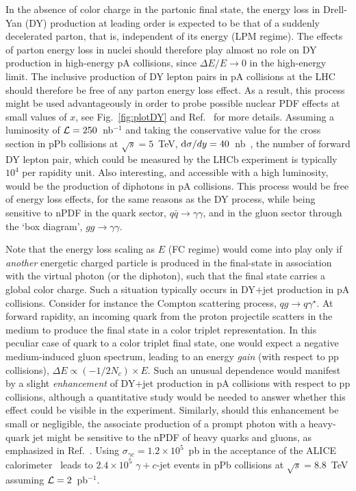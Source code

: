 \documentclass[../report.tex]{subfiles}
\begin{document}
In the absence of color charge in the partonic final state, the energy loss in Drell-Yan (DY) production at leading order is expected to be that of a suddenly decelerated parton, that is, independent of its energy (LPM regime). The effects of parton energy loss in nuclei should therefore play almost no role on DY production in high-energy pA collisions, since $\Delta E / E \to 0$ in the high-energy limit. The inclusive production of DY lepton pairs in pA collisions at the LHC should therefore be free of any parton energy loss effect. As a result, this process might be used advantageously in order to probe possible nuclear PDF effects at small values of $x$, see \eg Fig.~\ref{fig:plotDY} and Ref.~\cite{Arleo:2015qiv} for more details. Assuming a luminosity of ${\cal L}=250$~nb$^{-1}$ and taking the conservative value for the cross section in pPb collisions at $\sqrt{s}=5$~TeV, ${\rm d}\sigma/dy=40$~nb~\cite{Arleo:2015qiv}, the number of forward DY lepton pair, which could be measured by the LHCb experiment is typically $10^4$ per rapidity unit. Also interesting, and accessible with a high luminosity, would be the production of diphotons in pA collisions. This process would be free of energy loss effects, for the same reasons as the DY process, while being sensitive to nPDF in the quark sector, $q\bar{q} \to \gamma\gamma$, and in the gluon sector through the `box diagram', $gg \to \gamma\gamma$.

Note that the energy loss scaling as $E$ (FC regime) would come into play only if {\it another} energetic charged particle is produced in the final-state in association with the virtual photon (or the diphoton), such that the final state carries a global color charge. Such a situation typically occurs in DY$+$jet production in pA collisions. Consider for instance the Compton scattering process, $qg \to q\gamma^\star$. At forward rapidity, an incoming quark from the proton projectile scatters in the medium to produce the final state in a color triplet representation. In this peculiar case of quark to a color triplet final state, one would expect a negative medium-induced gluon spectrum, leading to an energy \emph{gain} (with respect to pp collisions), $\Delta E \propto (-1/2N_c)\times E$. Such an unusual dependence would manifest by a slight \emph{enhancement} of DY+jet production in pA collisions with respect to pp collisions, although a quantitative study would be needed to answer whether this effect could be visible in the experiment. Similarly, should this enhancement be small or negligible, the associate production of a prompt photon with a heavy-quark jet might be sensitive to the nPDF of heavy quarks and gluons, as emphasized in Ref.~\cite{Stavreva:2010mw}. Using $\sigma_{\gamma c} = 1.2\times10^5$~pb in the acceptance of the ALICE calorimeter~\cite{Stavreva:2010mw} leads to $2.4\times10^5$ $\gamma+c$-jet events in pPb collisions at $\sqrt{s}=8.8$~TeV assuming ${\cal L}=2$~pb$^{-1}$.
\end{document}
